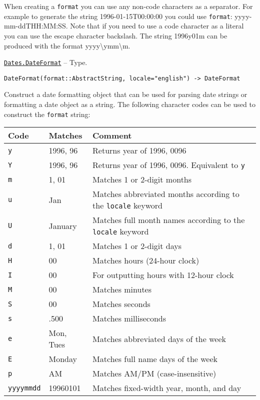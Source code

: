 \begin{adjustwidth}{2em}{0pt}
When creating a \texttt{format} you can use any non-code characters as a separator. For example to generate the string {\textquotedbl}1996-01-15T00:00:00{\textquotedbl} you could use \texttt{format}: {\textquotedbl}yyyy-mm-ddTHH:MM:SS{\textquotedbl}. Note that if you need to use a code character as a literal you can use the escape character backslash. The string {\textquotedbl}1996y01m{\textquotedbl} can be produced with the format {\textquotedbl}yyyy{\textbackslash}ymm{\textbackslash}m{\textquotedbl}.



\end{adjustwidth}
\hypertarget{18093459443158853001}{} 
\hyperlink{18093459443158853001}{\texttt{Dates.DateFormat}}  -- {Type.}

\begin{adjustwidth}{2em}{0pt}


\begin{verbatim}
DateFormat(format::AbstractString, locale="english") -> DateFormat
\end{verbatim}

Construct a date formatting object that can be used for parsing date strings or formatting a date object as a string. The following character codes can be used to construct the \texttt{format} string:


\begin{table}[h]

\begin{tabulary}{\linewidth}{|L|L|L|}
\hline
Code & Matches & Comment \\
\hline
\texttt{y} & 1996, 96 & Returns year of 1996, 0096 \\
\hline
\texttt{Y} & 1996, 96 & Returns year of 1996, 0096. Equivalent to \texttt{y} \\
\hline
\texttt{m} & 1, 01 & Matches 1 or 2-digit months \\
\hline
\texttt{u} & Jan & Matches abbreviated months according to the \texttt{locale} keyword \\
\hline
\texttt{U} & January & Matches full month names according to the \texttt{locale} keyword \\
\hline
\texttt{d} & 1, 01 & Matches 1 or 2-digit days \\
\hline
\texttt{H} & 00 & Matches hours (24-hour clock) \\
\hline
\texttt{I} & 00 & For outputting hours with 12-hour clock \\
\hline
\texttt{M} & 00 & Matches minutes \\
\hline
\texttt{S} & 00 & Matches seconds \\
\hline
\texttt{s} & .500 & Matches milliseconds \\
\hline
\texttt{e} & Mon, Tues & Matches abbreviated days of the week \\
\hline
\texttt{E} & Monday & Matches full name days of the week \\
\hline
\texttt{p} & AM & Matches AM/PM (case-insensitive) \\
\hline
\texttt{yyyymmdd} & 19960101 & Matches fixed-width year, month, and day \\
\hline
\end{tabulary}


\end{table}
\end{adjustwidth}
